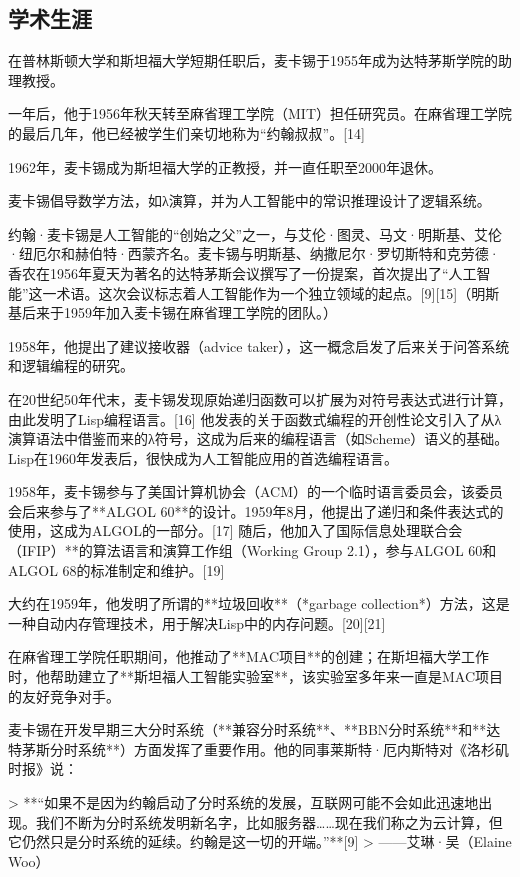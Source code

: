 \subsection{学术生涯}

在普林斯顿大学和斯坦福大学短期任职后，麦卡锡于1955年成为达特茅斯学院的助理教授。

一年后，他于1956年秋天转至麻省理工学院（MIT）担任研究员。在麻省理工学院的最后几年，他已经被学生们亲切地称为“约翰叔叔”。[14]

1962年，麦卡锡成为斯坦福大学的正教授，并一直任职至2000年退休。

麦卡锡倡导数学方法，如λ演算，并为人工智能中的常识推理设计了逻辑系统。



约翰·麦卡锡是人工智能的“创始之父”之一，与艾伦·图灵、马文·明斯基、艾伦·纽厄尔和赫伯特·西蒙齐名。麦卡锡与明斯基、纳撒尼尔·罗切斯特和克劳德·香农在1956年夏天为著名的达特茅斯会议撰写了一份提案，首次提出了“人工智能”这一术语。这次会议标志着人工智能作为一个独立领域的起点。[9][15]（明斯基后来于1959年加入麦卡锡在麻省理工学院的团队。）

1958年，他提出了建议接收器（advice taker），这一概念启发了后来关于问答系统和逻辑编程的研究。

在20世纪50年代末，麦卡锡发现原始递归函数可以扩展为对符号表达式进行计算，由此发明了Lisp编程语言。[16] 他发表的关于函数式编程的开创性论文引入了从λ演算语法中借鉴而来的λ符号，这成为后来的编程语言（如Scheme）语义的基础。Lisp在1960年发表后，很快成为人工智能应用的首选编程语言。

1958年，麦卡锡参与了美国计算机协会（ACM）的一个临时语言委员会，该委员会后来参与了**ALGOL 60**的设计。1959年8月，他提出了递归和条件表达式的使用，这成为ALGOL的一部分。[17] 随后，他加入了国际信息处理联合会（IFIP）**的算法语言和演算工作组（Working Group 2.1），参与ALGOL 60和ALGOL 68的标准制定和维护。[19]

大约在1959年，他发明了所谓的**垃圾回收**（*garbage collection*）方法，这是一种自动内存管理技术，用于解决Lisp中的内存问题。[20][21]

在麻省理工学院任职期间，他推动了**MAC项目**的创建；在斯坦福大学工作时，他帮助建立了**斯坦福人工智能实验室**，该实验室多年来一直是MAC项目的友好竞争对手。

麦卡锡在开发早期三大分时系统（**兼容分时系统**、**BBN分时系统**和**达特茅斯分时系统**）方面发挥了重要作用。他的同事莱斯特·厄内斯特对《洛杉矶时报》说：

> **“如果不是因为约翰启动了分时系统的发展，互联网可能不会如此迅速地出现。我们不断为分时系统发明新名字，比如服务器……现在我们称之为云计算，但它仍然只是分时系统的延续。约翰是这一切的开端。”**[9]  
> ——艾琳·吴（Elaine Woo）

